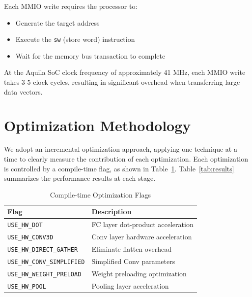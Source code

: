 \documentclass[conference]{IEEEtran}
\begin{document}
Each MMIO write requires the processor to:
\begin{itemize}
    \item Generate the target address
    \item Execute the \texttt{sw} (store word) instruction
    \item Wait for the memory bus transaction to complete
\end{itemize}

At the Aquila SoC clock frequency of approximately 41 MHz, each MMIO write takes 3-5 clock cycles, resulting in significant overhead when transferring large data vectors.




\section{Optimization Methodology}

We adopt an incremental optimization approach, applying one technique at a time to clearly measure the contribution of each optimization. Each optimization is controlled by a compile-time flag, as shown in Table~\ref{tab:flags}. Table~\ref{tab:results} summarizes the performance results at each stage.

\begin{table}[htbp]
\caption{Compile-time Optimization Flags}
\label{tab:flags}
\centering
\begin{tabular}{@{}ll@{}}
\toprule
Flag & Description \\
\midrule
\texttt{USE\_HW\_DOT} & FC layer dot-product acceleration \\
\texttt{USE\_HW\_CONV3D} & Conv layer hardware acceleration \\
\texttt{USE\_HW\_DIRECT\_GATHER} & Eliminate flatten overhead \\
\texttt{USE\_HW\_CONV\_SIMPLIFIED} & Simplified Conv parameters \\
\texttt{USE\_HW\_WEIGHT\_PRELOAD} & Weight preloading optimization \\
\texttt{USE\_HW\_POOL} & Pooling layer acceleration \\
\bottomrule
\end{tabular}
\end{table}
\end{document}
